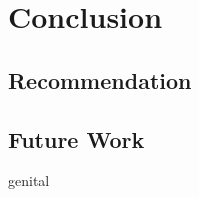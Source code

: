 \documentclass[ExampleMasters.tex]{subfiles}
\begin{document}
\clearpage
\chapter{Conclusion}


\section{Recommendation}

\section{Future Work}



genital\cite{paper:A}
\end{document}
